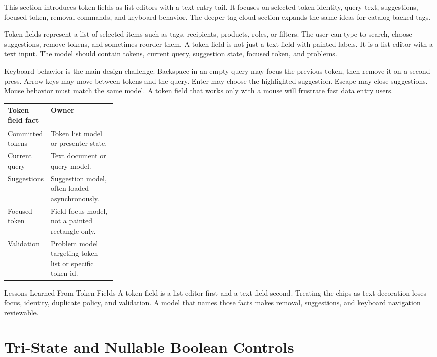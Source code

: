 \begin{roadmapbox}
This section introduces token fields as list editors with a text-entry tail. It
focuses on selected-token identity, query text, suggestions, focused token,
removal commands, and keyboard behavior. The deeper tag-cloud section expands
the same ideas for catalog-backed tags.
\end{roadmapbox}

Token fields represent a list of selected items such as tags, recipients, products,
roles, or filters. The user can type to search, choose suggestions, remove tokens, and
sometimes reorder them. A token field is not just a text field with painted labels. It
is a list editor with a text input. The model should contain tokens, current query,
suggestion state, focused token, and problems.

Keyboard behavior is the main design challenge. Backspace in an empty query may focus
the previous token, then remove it on a second press. Arrow keys may move between tokens
and the query. Enter may choose the highlighted suggestion. Escape may close
suggestions. Mouse behavior must match the same model. A token field that works only
with a mouse will frustrate fast data entry users.

\begin{tabularx}{0.96\linewidth}{@{}p{0.25\linewidth}X@{}}
\toprule
Token field fact & Owner\\
\midrule
Committed tokens & Token list model or presenter state.\\
Current query & Text document or query model.\\
Suggestions & Suggestion model, often loaded asynchronously.\\
Focused token & Field focus model, not a painted rectangle only.\\
Validation & Problem model targeting token list or specific token id.\\
\bottomrule
\end{tabularx}

\begin{principlebox}{Lessons Learned From Token Fields}
A token field is a list editor first and a text field second. Treating the chips
as text decoration loses focus, identity, duplicate policy, and validation. A
model that names those facts makes removal, suggestions, and keyboard navigation
reviewable.
\end{principlebox}

\section{Tri-State and Nullable Boolean Controls}


